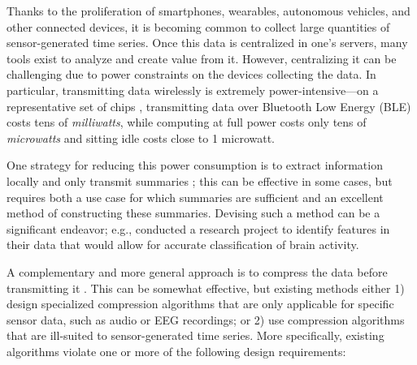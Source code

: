 





Thanks to the proliferation of smartphones, wearables, autonomous vehicles, and other connected devices, it is becoming common to collect large quantities of sensor-generated time series. Once this data is centralized in one's servers, many tools exist \cite{spark, mapreduce, hive, hdfs, influxDB, druid, littleTable, openTSDB} to analyze and create value from it. However, centralizing it can be challenging due to power constraints on the devices collecting the data. In particular, transmitting data wirelessly is extremely power-intensive---on a representative set of chips \cite{cc2540, cc2640}, transmitting data over Bluetooth Low Energy (BLE) costs tens of \textit{milliwatts}, while computing at full power costs only tens of \textit{microwatts} and sitting idle costs close to 1 microwatt.

One strategy for reducing this power consumption is to extract information locally and only transmit summaries \cite{guttagAnanthaEEG, socialFMRI}; this can be effective in some cases, but requires both a use case for which summaries are sufficient and an excellent method of constructing these summaries. Devising such a method can be a significant endeavor; e.g., \cite{guttagAnanthaEEG} conducted a research project to identify features in their data that would allow for accurate classification of brain activity.

A complementary and more general approach is to compress the data before transmitting it \cite{socialFMRI, lachCompress, sensorTransforms, iotSignals, iotCompressCrap}. This can be somewhat effective, but existing methods either 1) design specialized compression algorithms that are only applicable for specific sensor data, such as audio \cite{flac, shorten, aac, vorbis} or EEG \cite{guttagAnanthaEEG, eegCS} recordings; or 2) use compression algorithms that are ill-suited to sensor-generated time series. More specifically, existing algorithms violate one or more of the following design requirements:

